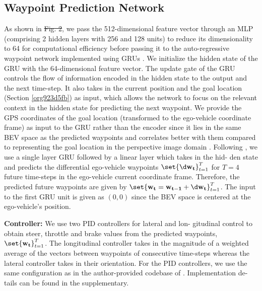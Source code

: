 \documentclass[letterpaper, 12pt]{article}
\theoremstyle{definition}
\theoremstyle{definition}
\theoremstyle{definition}
\theoremstyle{definition}
\theoremstyle{definition}
\begin{document}
\subsection{Waypoint Prediction Network \label{org2474921}}
\label{sec:org2b1d815}
As shown in \sout{Fig. 2}, we pass the 512-dimensional feature vector through an MLP
(comprising 2 hidden layers with 256 and 128 units) to reduce its dimensionality
to 64 for computational efficiency before passing it to the auto-regressive
waypoint network implemented using GRUs \cite{Cho2014}. We initialize the hidden
state of the GRU with the 64-dimensional feature vector. The update gate of the
GRU controls the flow of information encoded in the hidden state to the output
and the next time-step. It also takes in the current position and the goal
location (Section \ref{org923d5fb}) as input, which allows the network to focus
on the relevant context in the hidden state for predicting the next waypoint.
We provide the GPS coordinates of the goal location (transformed to the
ego-vehicle coordinate frame) as input to the GRU rather than the encoder since
it lies in the same BEV space as the predicted waypoints and correlates better
with them compared to representing the goal location in the perspective image
domain \cite{Chen2019}. Following \cite{Filos2020}, we use a single layer GRU
followed by a linear layer which takes in the hid- den state and predicts the
differential ego-vehicle waypoints \(\set{\d \bf w_{t}}_{t=1}^{T}\) for \(T=4\)
future time-steps in the ego-vehicle current coordinate frame. Therefore, the
predicted future waypoints are given by \(\set{\bf w_{t}=\bf w_{t-1} +\d \bf
w_{t}}_{t=1}^{T}\). The input to the first GRU unit is given as \((0,0)\) since
the BEV space is centered at the ego-vehicle’s position.

\textbf{Controller:} We use two PID controllers for lateral and lon- gitudinal control
to obtain steer, throttle and brake values from the predicted waypoints,
\(\set{\bf w_{t}}_{t=1}^{T}\). The longitudinal controller takes in the
magnitude of a weighted average of the vectors between waypoints of consecutive
time-steps whereas the lateral controller takes in their orientation. For the
PID controllers, we use the same configuration as in the author-provided
codebase of \cite{Chen2019}. Implementation de- tails can be found in the supplementary.
\end{document}
